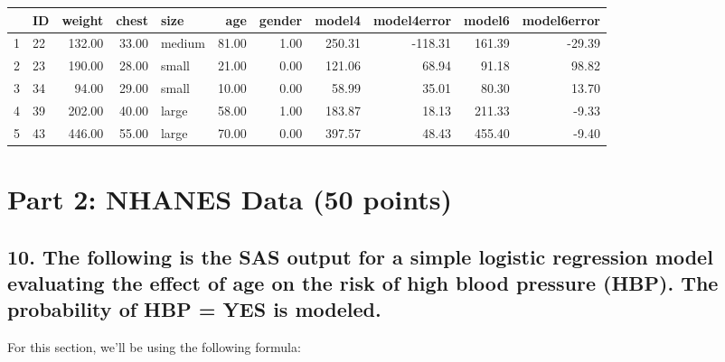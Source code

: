 \documentclass{article}
\begin{document}
\begin{table}[ht]
\centering
\begin{tabular}{rlrrlrrrrrr}
  \hline
 & ID & weight & chest & size & age & gender & model4 & model4error & model6 & model6error \\ 
  \hline
1 & 22 & 132.00 & 33.00 & medium & 81.00 & 1.00 & 250.31 & -118.31 & 161.39 & -29.39 \\ 
  2 & 23 & 190.00 & 28.00 & small & 21.00 & 0.00 & 121.06 & 68.94 & 91.18 & 98.82 \\ 
  3 & 34 & 94.00 & 29.00 & small & 10.00 & 0.00 & 58.99 & 35.01 & 80.30 & 13.70 \\ 
  4 & 39 & 202.00 & 40.00 & large & 58.00 & 1.00 & 183.87 & 18.13 & 211.33 & -9.33 \\ 
  5 & 43 & 446.00 & 55.00 & large & 70.00 & 0.00 & 397.57 & 48.43 & 455.40 & -9.40 \\ 
   \hline
\end{tabular}
\end{table}

\begin{Schunk}
\end{Schunk}

\newpage

\section*{Part 2: NHANES Data (50 points)}

\subsection*{10. The following is the SAS output for a simple logistic regression model evaluating the effect of age on the risk of high blood pressure (HBP). The probability of HBP = YES is modeled.}

For this section, we'll be using the following formula: \\
\end{document}
